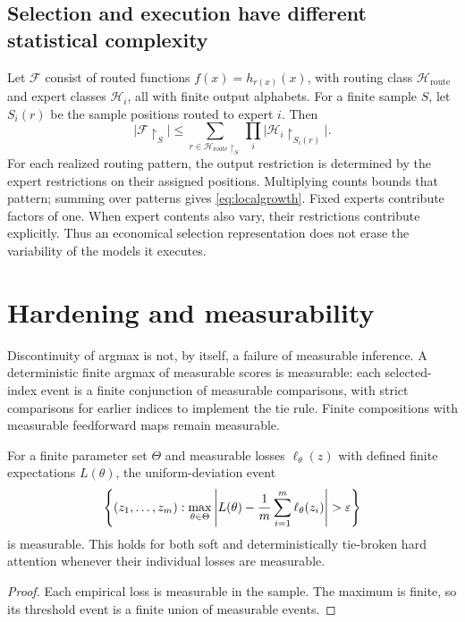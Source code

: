 \subsection{Selection and execution have different statistical complexity}
Let $\mathcal F$ consist of routed functions $f(x)=h_{r(x)}(x)$, with routing class $\mathcal H_{\mathrm{route}}$ and expert classes $\mathcal H_i$, all with finite output alphabets. For a finite sample $S$, let $S_i(r)$ be the sample positions routed to expert $i$. Then
\begin{equation}
 \bigl|\mathcal F\!\restriction_S\bigr|
 \le\sum_{r\in\mathcal H_{\mathrm{route}}\restriction_S}
          \prod_i\bigl|\mathcal H_i\!\restriction_{S_i(r)}\bigr|.
 \label{eq:localgrowth}
\end{equation}
For each realized routing pattern, the output restriction is determined by the expert restrictions on their assigned positions. Multiplying counts bounds that pattern; summing over patterns gives \eqref{eq:localgrowth}. Fixed experts contribute factors of one. When expert contents also vary, their restrictions contribute explicitly. Thus an economical selection representation does not erase the variability of the models it executes.

\section{Hardening and measurability}\label{app:measurability}
Discontinuity of argmax is not, by itself, a failure of measurable inference. A deterministic finite argmax of measurable scores is measurable: each selected-index event is a finite conjunction of measurable comparisons, with strict comparisons for earlier indices to implement the tie rule. Finite compositions with measurable feedforward maps remain measurable.

\begin{proposition}
For a finite parameter set $\Theta$ and measurable losses $\ell_\theta(z)$ with defined finite expectations $L(\theta)$, the uniform-deviation event
\[
 \left\{(z_1,\ldots,z_m):
 \max_{\theta\in\Theta}\left|L(\theta)-\frac1m\sum_{i=1}^m\ell_\theta(z_i)\right|>\eps\right\}
\]
is measurable. This holds for both soft and deterministically tie-broken hard attention whenever their individual losses are measurable.
\end{proposition}
\begin{proof}
Each empirical loss is measurable in the sample. The maximum is finite, so its threshold event is a finite union of measurable events.
\end{proof}

